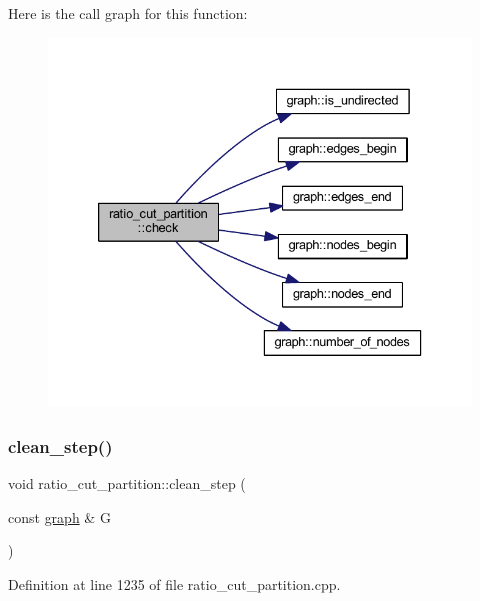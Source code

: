 Here is the call graph for this function\+:\nopagebreak
\begin{figure}[H]
\begin{center}
\leavevmode
\includegraphics[width=333pt]{classratio__cut__partition_a469c613c69db19cb63e492075346fea2_cgraph}
\end{center}
\end{figure}
\mbox{\label{classratio__cut__partition_aa8e1c0cce3f126e1aa4a3aa8489986fa}} 
\subsubsection{\texorpdfstring{clean\+\_\+step()}{clean\_step()}}
{\footnotesize\ttfamily void ratio\+\_\+cut\+\_\+partition\+::clean\+\_\+step (\begin{DoxyParamCaption}\item[{const \mbox{\hyperlink{classgraph}{graph}} \&}]{G }\end{DoxyParamCaption})\hspace{0.3cm}{\ttfamily [protected]}}



Definition at line 1235 of file ratio\+\_\+cut\+\_\+partition.\+cpp.


